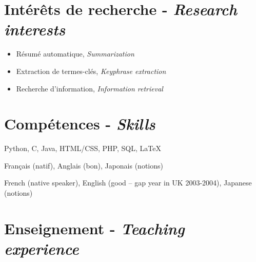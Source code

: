 \documentclass[11pt,a4paper]{moderncv}
\begin{document}
\section{Intérêts de recherche - \textit{Research interests}}

\begin{itemize}[leftmargin=0.5cm,itemsep=-0.1cm]
    \item Résumé automatique, \textit{Summarization}
    \item Extraction de termes-clés, \textit{Keyphrase extraction}
    \item Recherche d'information, \textit{Information retrieval}
\end{itemize}

\section{Compétences - \textit{Skills}}

\setlength{\hintscolumnwidth}{2.4cm}

       {Python, C, Java, HTML/CSS, PHP, SQL, \LaTeX}

\vspace*{0.5em}

       {Français (natif), Anglais (bon), Japonais (notions)}

       {French (native speaker), English (good -- gap year in UK 2003-2004), 
       Japanese (notions)}

\setlength{\hintscolumnwidth}{2.2cm}

\section{Enseignement - \textit{Teaching experience}}
\end{document}
